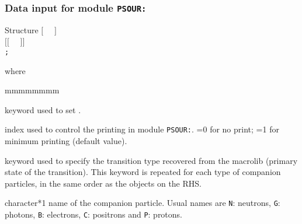 \subsubsection{Data input for module {\tt PSOUR:}}\label{sect:descPSOUR}

\vskip -0.5cm

\begin{DataStructure}{Structure }
$[$~ ~$]$ \\
$[[$~ ~$]]$ \\
{\tt ;}
\end{DataStructure}

\noindent where
\begin{ListeDeDescription}{mmmmmmmm}

\item[\moc{EDIT}] keyword used to set .

\item[\dusa{iprint}] index used to control the printing in module {\tt PSOUR:}. =0 for no print; =1 for minimum printing (default value).

\item[\moc{PARTICLE}] keyword used to specify the transition type recovered from the {\sc macrolib} (primary state of the transition). This keyword is repeated for each type of companion particles, in the same order as the  objects on the RHS.

\item[\dusa{htype}] character*1 name of the companion particle. Usual names are {\tt N}: neutrons, {\tt G}: photons, {\tt B}: electrons,
{\tt C}: positrons and {\tt P}: protons.

\end{ListeDeDescription}

\eject
